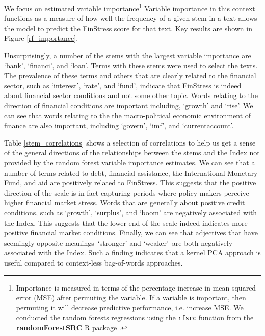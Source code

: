 \documentclass[]{article}
\begin{document}
We focus on estimated variable importance\footnote{Importance is measured in terms of the percentage increase in mean squared error (MSE) after permuting the variable. If a variable is important, then permuting it will decrease predictive performance, i.e. increase MSE. We conducted the random forests regressions using the \texttt{rfsrc} function from the \textbf{randomForestSRC} R package \citep{randomForestSRCCite}.} Variable importance in this context functions as a measure of how well the frequency of a given stem in a text allows the model to predict the FinStress score for that text. Key results are shown in Figure \ref{rf_importance}.

Unsurprisingly, a number of the stems with the largest variable importance are `bank', `financi', and `loan'. Terms with these stems were used to select the texts. The prevalence of these terms and others that are clearly related to the financial sector, such as `interest', `rate', and `fund', indicate that FinStress is indeed about financial sector conditions and not some other topic. Words relating to the direction of financial conditions are important including, `growth' and `rise'. We can see that words relating to the the macro-political economic environment of finance are also important, including `govern', `imf', and `currentaccount'.

Table \ref{stem_correlations} shows a selection of correlations to help us get a sense of the general directions of the relationships between the stems and the Index not provided by the random forest variable importance estimates. We can see that a number of terms related to debt, financial assistance, the International Monetary Fund, and aid are positively related to FinStress. This suggests that the positive direction of the scale is in fact capturing periods where policy-makers perceive higher financial market stress. Words that are generally about positive credit conditions, such as `growth', `surplus', and `boom' are negatively associated with the Index. This suggests that the lower end of the scale indeed indicates more positive financial market conditions. Finally, we can see that adjectives that have seemingly opposite meanings--`stronger' and `weaker'--are both negatively associated with the Index. Such a finding indicates that a kernel PCA approach is useful compared to context-less bag-of-words approaches.
\end{document}
